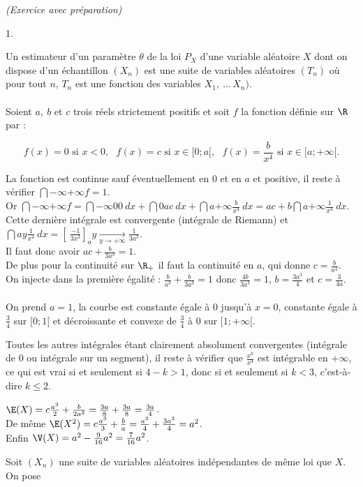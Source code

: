 \documentclass[11pt]{article}%
\begin{document}
 \begin{exercice}{\it (Exercice avec préparation)}~
 \begin{noliste}{1.}
 \setlength{\itemsep}{4mm}
 \item Un estimateur d'un paramètre $\theta$ de la loi $P_{X}$ d'une
variable aléatoire $X$ dont on dispose d'un échantillon $(X_{n})$ est
une suite de variables aléatoires $(T_{n})$ où pour tout $n$, $T_{n}$
est une fonction des variables $X_{1},\ \dots\, X_{n})$. \\
\\
 Soient $a,\ b$ et $c$ trois réels strictement positifs et soit $f$ la
fonction définie sur $\R$ par : 
 
\[
 f(x) = 0 \text{ si } x < 0,\ \ \ f(x) = c \text{ si } x \in [ 0 ; a[,\
\ \ f(x) = \frac{b}{x^{4}} \text{ si } x \in [ a ; + \infty[.
\]
 \item La fonction est continue sauf éventuellement en $0$ et en $a$ et
positive, il reste à vérifier $\dint{-\infty}{+ \infty} f = 1$. \\
 Or $\dint{-\infty}{+ \infty} f = \dint{-\infty}{0} 0\ dx + \dint{0}{a}
c\ dx + \dint{a}{+ \infty} \frac{b}{x^{4}}\ dx = a c + b \dint{a}{+
\infty} \frac{1}{x^{4}}\ dx$. \\
 Cette dernière intégrale est convergente (intégrale de Riemann) et
$\dint{a}{y} \frac{1}{x^{4}}\ dx = \left[ \ \frac{-1}{3x^{3}}
\right]_{a}{y} \xrightarrow[y \rightarrow + \infty]{}
\frac{1}{3a^{3}}$. \\
 Il faut donc avoir $ a c + \frac{ b}{3 a^{3}} = 1$. \\
 De plus pour la continuité sur $\R_+ $ il faut la continuité en $a$,
qui donne $c = \frac{b}{a^{4}}$. \\
 On injecte dans la première égalité : $ \frac{b}{a^{3}} + \frac{b}{3
a^{3}} = 1$ donc $\frac{4b }{3a^{3}} = 1$, $b = \frac{3a^{3}}{4}$ et $c
= \frac{3}{4a}$. \\
\\
 On prend $a = 1$, la courbe est constante égale à 0 jusqu'à $x = 0$,
constante égale à $\frac{3}{4}$ sur $[0;1[$ et décroissante et convexe
de $\frac{3}{4}$ à 0 sur $[ 1 ; + \infty[$. \\
 \item Toutes les autres intégrales étant clairement absolument
convergentes (intégrale de 0 ou intégrale sur un segment), il reste à
vérifier que $ \frac{x^{k}}{x^{4}}$ est intégrable en $ + \infty$, ce
qui est vrai si et seulement si $4-k >1$, donc si et seulement si $k <
3$, c'est-à-dire $k \leq 2$. \\
 \item $\E(X) = c \frac{a^{2}}{2} + \frac{b}{2a^{2}} = \frac{3a}{8} +
\frac{3a}{8} = \frac{3a}{4}$. \\
 De même $\E(X^{2}) = c \frac{a^{3}}{3} + \frac{b}{a} = \frac{a^{2}}{4}
+ \frac{3 a^{2}}{4} = a^{2}$. \\
 Enfin $\V(X) = a^{2} - \frac{9}{16} a^{2} = \frac{7}{16} a^{2}$. \\
 \item Soit $(X_{n})$ une suite de variables aléatoires indépendantes
de même loi que $X$. On pose 
 

\end{noliste}
\end{exercice}
\end{document}
